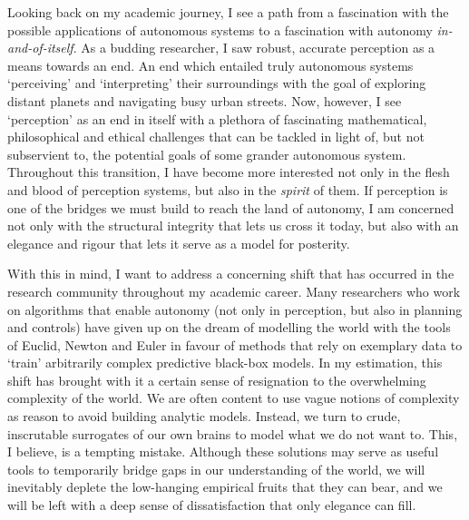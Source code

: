 
Looking back on my academic journey, I see a path from a fascination with the possible applications of autonomous systems to a fascination with autonomy \textit{in-and-of-itself}. As a budding researcher, I saw robust, accurate perception as a means towards an end. An end which entailed truly autonomous systems `perceiving' and `interpreting' their surroundings with the goal of exploring distant planets and navigating busy urban streets. Now, however, I see `perception' as an end in itself with a plethora of fascinating mathematical, philosophical and ethical challenges that can be tackled in light of, but not subservient to, the potential goals of some grander autonomous system. Throughout this transition, I have become more interested not only in the flesh and blood of perception systems, but also in the \textit{spirit} of them. If perception is one of the bridges we must build to reach the land of autonomy, I am concerned not only with the structural integrity that lets us cross it today, but also with an elegance and rigour that lets it serve as a model for posterity. 

With this in mind, I want to address a concerning shift that has occurred in the research community throughout my academic career. Many researchers who work on algorithms that enable autonomy (not only in perception, but also in planning and controls) have given up on the dream of modelling the world with the tools of Euclid, Newton and Euler in favour of methods that rely on exemplary data to `train' arbitrarily complex predictive black-box models. In my estimation, this shift has brought with it a certain sense of resignation to the overwhelming complexity of the world. We are often content to use vague notions of complexity as reason to avoid building analytic models. Instead, we turn to crude, inscrutable surrogates of our own brains to model what we do not want to. This, I believe, is a tempting mistake. Although these solutions may serve as useful tools to temporarily bridge gaps in our understanding of the world, we will inevitably deplete the low-hanging empirical fruits that they can bear, and we will be left with a deep sense of dissatisfaction that only elegance can fill. 

